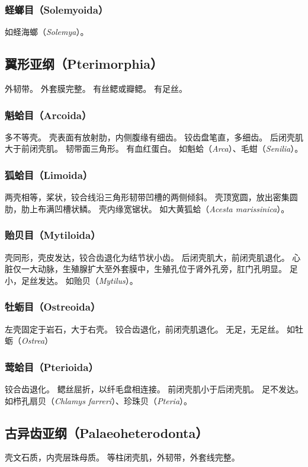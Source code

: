 \documentclass[11pt]{article}
\begin{document}
\subsubsection{蛏螂目（Solemyoida）}
如蛏海螂（\textit{Solemya}）。

\subsection{翼形亚纲（Pterimorphia）}
外韧带。
外套膜完整。
有丝鳃或瓣鳃。
有足丝。

\subsubsection{魁蛤目（Arcoida）}
多不等壳。
壳表面有放射肋，内侧腹缘有细齿。
铰齿盘笔直，多细齿。
后闭壳肌大于前闭壳肌。
韧带面三角形。
有血红蛋白。
如魁蛤（\textit{Arca}）、毛蚶（\textit{Senilia}）。

\subsubsection{狐蛤目（Limoida）}
两壳相等，桨状，铰合线沿三角形韧带凹槽的两侧倾斜。
壳顶宽圆，放出密集圆肋，肋上布满凹槽状鳞。
壳内缘宽锯状。
如大黄狐蛤（\textit{Acesta marissinica}）。

\subsubsection{贻贝目（Mytiloida）}
壳同形，壳皮发达，铰合齿退化为结节状小齿。
后闭壳肌大，前闭壳肌退化。
心脏仅一大动脉，生殖腺扩大至外套膜中，生殖孔位于肾外孔旁，肛门孔明显。
足小，足丝发达。
如贻贝（\textit{Mytilus}）。

\subsubsection{牡蛎目（Ostreoida）}
左壳固定于岩石，大于右壳。
铰合齿退化，前闭壳肌退化。
无足，无足丝。
如牡蛎（\textit{Ostrea}）

\subsubsection{莺蛤目（Pterioida）}
铰合齿退化。
鳃丝屈折，以纤毛盘相连接。
前闭壳肌小于后闭壳肌。
足不发达。
如栉孔扇贝（\textit{Chlamys farreri}）、珍珠贝（\textit{Pteria}）。

\subsection{古异齿亚纲（Palaeoheterodonta）}
壳文石质，内壳层珠母质。
等柱闭壳肌，外韧带，外套线完整。
\end{document}
